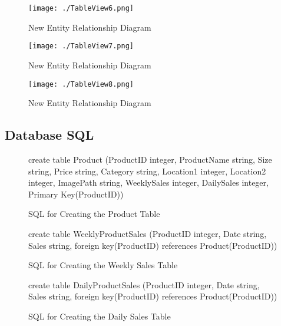\begin{figure}[H]
    \texttt{[image: ./TableView6.png]}
    \caption{New Entity Relationship Diagram} \label{fig:table-view-6}
\end{figure}

\begin{figure}[H]
    \texttt{[image: ./TableView7.png]}
    \caption{New Entity Relationship Diagram} \label{fig:table-view-7}
\end{figure}

\begin{figure}[H]
    \texttt{[image: ./TableView8.png]}
    \caption{New Entity Relationship Diagram} \label{fig:table-view-8}
\end{figure}


\subsection{Database SQL}

\begin{figure}[H]
	 \caption{SQL for Creating the Product Table} \label{fig:product-sql}
	\begin{sql}
	create table Product
              (ProductID integer,
              ProductName string,
              Size string,
              Price string,
              Category string,
              Location1 integer,
              Location2 integer,
              ImagePath string,
              WeeklySales integer,
              DailySales integer,
              Primary Key(ProductID))
	\end{sql}
\end{figure}

\begin{figure}[H]
	 \caption{SQL for Creating the Weekly Sales Table} \label{fig:weekly-sql}
	\begin{sql}
	create table WeeklyProductSales
          (ProductID integer,
          Date string,
          Sales string,
          foreign key(ProductID) references Product(ProductID))
	\end{sql}
\end{figure}

\begin{figure}[H]
	 \caption{SQL for Creating the Daily Sales Table} \label{fig:daily-sql}
	\begin{sql}
	create table DailyProductSales
          (ProductID integer,
          Date string,
          Sales string,
          foreign key(ProductID) references Product(ProductID))
	\end{sql}
\end{figure}

